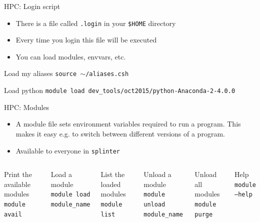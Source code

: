 \documentclass{beamer}
\begin{document}
\begin{frame}{HPC: Login script}
  \begin{itemize}
    \item There is a file called \texttt{.login} in your \texttt{\$HOME} directory
    \item Every time you login this file will be executed
    \item You can load modules, envvars, etc.
  \end{itemize}
  \begin{Examples}
    \begin{block}{Load my aliases}
      \texttt{source $\sim$/aliases.csh}
    \end{block}
    \begin{block}{Load python}
      \texttt{module load dev\_tools/oct2015/python-Anaconda-2-4.0.0}
    \end{block}
  \end{Examples}
\end{frame}

\begin{frame}{HPC: Modules}
	\begin{itemize}
		\item A module file sets environment variables required to run a program. This makes it easy e.g. to switch between different versions of a program.
		\item Available to everyone in \texttt{splinter}
	\end{itemize}
	
	\begin{Examples}
	    \begin{columns}
		\begin{block}{Print the available modules}
			\texttt{module avail}
		\end{block}
		\begin{block}{Load a module}
			\texttt{module load module\_name}
		\end{block}
		\begin{block}{List the loaded modules}
			\texttt{module list}
		\end{block}
	
		\begin{block}{Unload a module}
			\texttt{module unload module\_name}
		\end{block}
		\begin{block}{Unload all modules}
			\texttt{module purge}
		\end{block}		
		\begin{block}{Help}
			\texttt{module --help}
		\end{block}	
	    \end{columns}								
	\end{Examples}
\end{frame}
\end{document}
